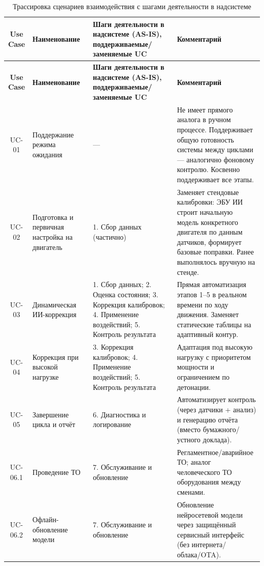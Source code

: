 \documentclass[14pt, a4paper]{extarticle}
\begin{document}
				{\fontsize{9}{11}\selectfont
					\begin{xltabular}{\textwidth}{|c|L|L|L|}
					\caption{Трассировка сценариев взаимодействия с шагами деятельности в надсистеме}\label{tab:uc-trace}\\
					\hline
					\textbf{Use Case} & \textbf{Наименование} & \textbf{Шаги деятельности в надсистеме (AS-IS), поддерживаемые/заменяемые UC} & \textbf{Комментарий} \\
					\hline
					\endfirsthead
					\hline
					\textbf{Use Case} & \textbf{Наименование} & \textbf{Шаги деятельности в надсистеме (AS-IS), поддерживаемые/заменяемые UC} & \textbf{Комментарий} \\
					\hline
					\endhead
					\hline
					\endfoot
					\hline
					\endlastfoot
					UC-01 & Поддержание режима ожидания & — & Не имеет прямого аналога в ручном процессе. Поддерживает общую готовность системы между циклами — аналогично фоновому контролю. Косвенно поддерживает все этапы. \\
					\hline
					UC-02 & Подготовка и первичная настройка на двигатель & 1. Сбор данных (частично) & Заменяет стендовые калибровки: ЭБУ ИИ строит начальную модель конкретного двигателя по данным датчиков, формирует базовые поправки. Ранее выполнялось вручную на стенде. \\
					\hline
					UC-03 & Динамическая ИИ-коррекция & 1. Сбор данных; 2. Оценка состояния; 3. Коррекция калибровок; 4. Применение воздействий; 5. Контроль результата & Прямая автоматизация этапов 1–5 в реальном времени по ходу движения. Заменяет статические таблицы на адаптивный контур. \\
					\hline
					UC-04 & Коррекция при высокой нагрузке & 3. Коррекция калибровок; 4. Применение воздействий; 5. Контроль результата & Адаптация под высокую нагрузку с приоритетом мощности и ограничением по детонации. \\
					\hline
					UC-05 & Завершение цикла и отчёт & 6. Диагностика и логирование & Автоматизирует контроль (через датчики + анализ) и генерацию отчёта (вместо бумажного/устного доклада). \\
					\hline
					UC-06.1 & Проведение ТО & 7. Обслуживание и обновление & Регламентное/аварийное ТО; аналог человеческого ТО оборудования между сменами. \\
					\hline
					UC-06.2 & Офлайн-обновление модели & 7. Обслуживание и обновление & Обновление нейросетевой модели через защищённый сервисный интерфейс (без интернета/облака/OTA). \\
					\hline

\end{xltabular}}
\end{document}
